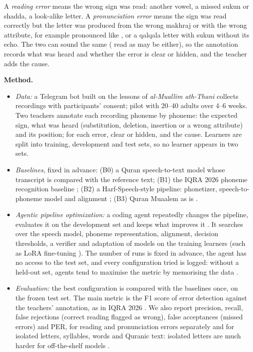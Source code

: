 \documentclass[a4paper,14pt]{extarticle}
\begin{document}
A \emph{reading error} means the wrong sign was read: another vowel, a missed sukun or shadda, a
look-alike letter. A \emph{pronunciation error} means the sign was read correctly but the letter was produced
from the wrong makhraj \cite{SRC-059} or with the wrong attribute, for example  pronounced like
, or a qalqala letter with sukun without its echo. The two can sound the same ( read as  may
be either), so the annotation records what was heard and whether the error is clear or hidden, and the
teacher adds the cause.

\textbf{Method.}
\begin{itemize}
  \item \emph{Data:} a Telegram bot built on the lessons of \emph{al-Muallim ath-Thani} collects recordings
    with participants' consent; pilot with 20--40 adults over 4--6 weeks. Two teachers annotate each
    recording phoneme by phoneme: the expected sign, what was heard (substitution, deletion, insertion
    or a wrong attribute) and its position; for each error, clear or hidden, and the cause. Learners are split into training, development and test sets, so no learner appears in two
    sets.
  \item \emph{Baselines}, fixed in advance: (B0) a Quran speech-to-text model whose transcript is compared
    with the reference text; (B1) the IQRA 2026 phoneme recognition baseline \cite{SRC-031,SRC-066};
    (B2) a Harf-Speech-style pipeline: phonetizer, speech-to-phoneme model and alignment \cite{SRC-149};
    (B3) Quran Muaalem as is \cite{SRC-002}.
  \item \emph{Agentic pipeline optimization:} a coding agent repeatedly changes the pipeline, evaluates it
    on the development set and keeps what improves it \cite{SRC-067}. It searches over the speech model,
    phoneme representation, alignment, decision thresholds, a verifier and adaptation of models on the
    training learners (such as LoRA fine-tuning \cite{SRC-111}). The number of runs is fixed in advance, the
    agent has no access to the test set, and every configuration tried is logged: without a held-out set,
    agents tend to maximise the metric by memorising the data \cite{SRC-067}.
  \item \emph{Evaluation:} the best configuration is compared with the baselines once, on the frozen test
    set. The main metric is the F1 score of error detection against the teachers' annotation, as in
    IQRA 2026 \cite{SRC-031}. We also report precision, recall, false rejections (correct reading flagged as
    wrong), false acceptances (missed errors) and PER, for reading and pronunciation errors separately and
    for isolated letters, syllables, words and Quranic text: isolated letters are much harder for
    off-the-shelf models \cite{SRC-151}.
\end{itemize}
\end{document}
